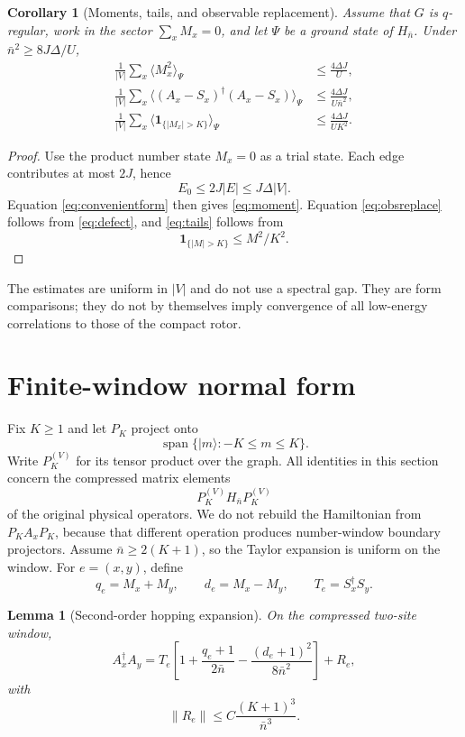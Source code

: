 \documentclass[11pt]{article}
\newtheorem{lemma}[theorem]{Lemma}
\newtheorem{corollary}[theorem]{Corollary}
\newcommand{\nbar}{\bar n}
\newcommand{\one}{\mathbf 1}
\begin{document}
\begin{corollary}[Moments, tails, and observable replacement]
Assume that $G$ is $q$-regular, work in the sector $\sum_xM_x=0$, and let $\Psi$ be a ground state of $H_{\nbar}$. Under $\nbar^2\ge8J\Delta/U$,
\begin{align}
\frac1{|V|}\sum_x\langle M_x^2\rangle_\Psi
&\le \frac{4\Delta J}{U},
\label{eq:moment}\\
\frac1{|V|}\sum_x\langle(A_x-S_x)^\dagger(A_x-S_x)\rangle_\Psi
&\le \frac{4\Delta J}{U\nbar^2},
\label{eq:obsreplace}\\
\frac1{|V|}\sum_x\langle\one_{\{|M_x|>K\}}\rangle_\Psi
&\le \frac{4\Delta J}{UK^2}.
\label{eq:tails}
\end{align}
\end{corollary}

\begin{proof}
Use the product number state $M_x=0$ as a trial state. Each edge contributes at most $2J$, hence
\[
E_0\le2J|E|\le J\Delta|V|.
\]
Equation \eqref{eq:convenientform} then gives \eqref{eq:moment}. Equation \eqref{eq:obsreplace} follows from \eqref{eq:defect}, and \eqref{eq:tails} follows from
\[
\one_{\{|M|>K\}}\le M^2/K^2.
\]
\end{proof}

The estimates are uniform in $|V|$ and do not use a spectral gap. They are form comparisons; they do not by themselves imply convergence of all low-energy correlations to those of the compact rotor.

\section{Finite-window normal form}

Fix $K\ge1$ and let $P_K$ project onto
\[
\operatorname{span}\{\lvert m\rangle:-K\le m\le K\}.
\]
Write $P_K^{(V)}$ for its tensor product over the graph. All identities in this section concern the compressed matrix elements
\[
P_K^{(V)}H_{\nbar}P_K^{(V)}
\]
of the original physical operators. We do not rebuild the Hamiltonian from $P_KA_xP_K$, because that different operation produces number-window boundary projectors. Assume $\nbar\ge2(K+1)$, so the Taylor expansion is uniform on the window. For $e=(x,y)$, define
\begin{equation}
q_e=M_x+M_y,
\qquad
d_e=M_x-M_y,
\qquad
T_e=S_x^\dagger S_y.
\label{eq:qd}
\end{equation}

\begin{lemma}[Second-order hopping expansion]
On the compressed two-site window,
\begin{equation}
A_x^\dagger A_y
=T_e\left[1+\frac{q_e+1}{2\nbar}-\frac{(d_e+1)^2}{8\nbar^2}\right]+R_e,
\label{eq:hoppingexpansion}
\end{equation}
with
\begin{equation}
\|R_e\|\le C\frac{(K+1)^3}{\nbar^3}.
\label{eq:remainderedge}
\end{equation}
\end{lemma}
\end{document}
